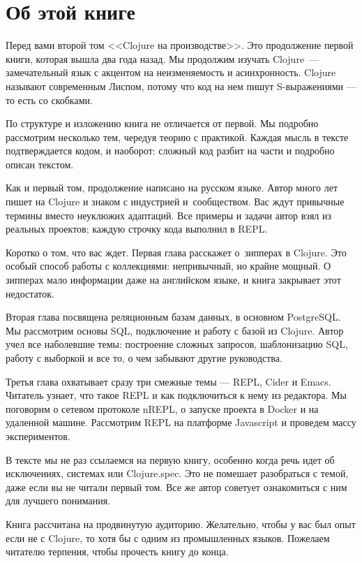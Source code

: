 
\section*{Об этой книге}

Перед вами второй том <<Clojure на производстве>>. Это продолжение первой книги,
которая вышла два года назад. Мы продолжим изучать Clojure~--- замечательный язык
с акцентом на неизменяемость и асинхронность. Clojure называют современным
Лиспом, потому что код на нем пишут S-выражениями — то есть со скобками.

По структуре и изложению книга не отличается от первой. Мы подробно рассмотрим
несколько тем, чередуя теорию с практикой. Каждая мысль в тексте подтверждается
кодом, и наоборот: сложный код разбит на части и подробно описан текстом.

Как и первый том, продолжение написано на русском языке. Автор много лет пишет
на Clojure и знаком с индустрией и~сообществом. Вас ждут привычные термины
вместо неуклюжих адаптаций. Все примеры и задачи автор взял из реальных
проектов; каждую строчку кода выполнил в REPL.

Коротко о том, что вас ждет. Первая глава расскажет о~зипперах в Clojure. Это
особый способ работы с коллекциями: непривычный, но крайне мощный. О зипперах
мало информации даже на английском языке, и книга закрывает этот недостаток.

Вторая глава посвящена реляционным базам данных, в основном PostgreSQL. Мы
рассмотрим основы SQL, подключение и работу с базой из Clojure. Автор учел все
наболевшие темы: построение сложных запросов, шаблонизацию SQL, работу с
выборкой и все то, о чем забывают другие руководства.

Третья глава охватывает сразу три смежные темы — REPL, Cider и Emacs. Читатель
узнает, что такое REPL и как подключиться к нему из редактора. Мы поговорим о
сетевом протоколе nREPL, о запуске проекта в Docker и на удаленной
машине. Рассмотрим REPL на платформе Javascript и проведем массу экспериментов.

В тексте мы не раз ссылаемся на первую книгу, особенно когда речь идет об
исключениях, системах или Clojure.spec. Это не помешает разобраться с темой,
даже если вы не читали первый том. Все же автор советует ознакомиться с ним для
лучшего понимания.

Книга рассчитана на продвинутую аудиторию. Желательно, чтобы у вас был опыт если
не с Clojure, то хотя бы с одним из промышленных языков. Пожелаем читателю
терпения, чтобы прочесть книгу до конца.

